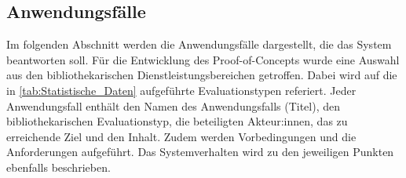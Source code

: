 


\subsection{Anwendungsfälle}
\label{chap:four_one_five}
Im folgenden Abschnitt werden die Anwendungsfälle dargestellt, die das System beantworten soll. Für die Entwicklung des Proof-of-Concepts wurde eine Auswahl aus den bibliothekarischen Dienstleistungsbereichen getroffen. 
Dabei wird auf die in \autoref{tab:Statistische_Daten} aufgeführte Evaluationstypen referiert.
Jeder Anwendungsfall enthält den Namen des Anwendungsfalls (Titel), den bibliothekarischen Evaluationstyp, die beteiligten Akteur:innen, das zu erreichende Ziel und
den Inhalt. Zudem werden Vorbedingungen und die Anforderungen aufgeführt.
Das Systemverhalten wird zu den jeweiligen Punkten ebenfalls beschrieben.


